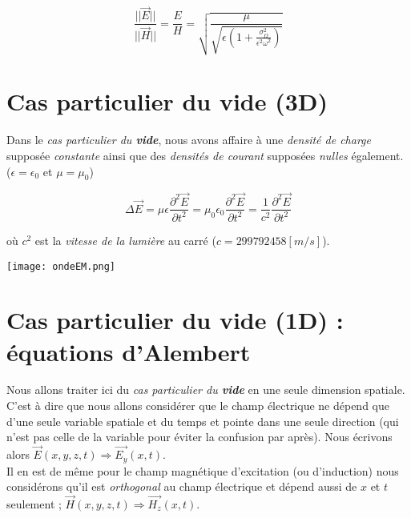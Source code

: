 \[ \frac{|| \vec{E} ||}{|| \vec{H} ||} =  \frac{E}{H} =\sqrt{\frac{\mu}{\sqrt{\epsilon(1+\frac{\sigma_{\Omega}^{2}}{\epsilon^{2} \omega^{2}})}}}\]

\section{Cas particulier du vide (3D)} 

Dans le \textit{cas particulier du \textbf{vide}}, nous avons affaire à une \textit{densité de charge} supposée \textit{constante} ainsi que des \textit{densités de courant} supposées \textit{nulles} également.
($\epsilon = \epsilon_{0}$ et $\mu = \mu_{0}$)

\[ \Delta \vec{E} = \mu \epsilon  \frac{\partial^{2} \vec{E}}{\partial t^{2}} = \mu_{0} \epsilon_{0}  \frac{\partial^{2} \vec{E}}{\partial t^{2}} =\frac{1}{c^{2}} \frac{\partial^{2} \vec{E}}{\partial t^{2}} \]

où $c^{2}$ est la \textit{vitesse de la lumière} au carré ($c = 299 792 458 [m/s]$).

\begin{center}
\texttt{[image: ondeEM.png]}
\end{center}


\section{Cas particulier du vide (1D) : équations d'Alembert}

Nous allons traiter ici du \textit{cas particulier du \textbf{vide}} en une seule dimension spatiale.  \\
C'est à dire que nous allons considérer que le champ électrique ne dépend que d'une seule variable spatiale et du temps et pointe dans une seule direction (qui n'est pas celle de la variable pour éviter la confusion par après).
Nous écrivons alors $\vec{E}(x,y,z,t) \Rightarrow \vec{E_{y}}(x,t)$. \\
Il en est de même pour le champ magnétique d'excitation (ou d'induction) nous considérons qu'il est 
\textit{orthogonal} au champ électrique et dépend aussi de $x$ et $t$ seulement ; $\vec{H}(x,y,z,t) \Rightarrow \vec{H_{z}}(x,t)$. 

